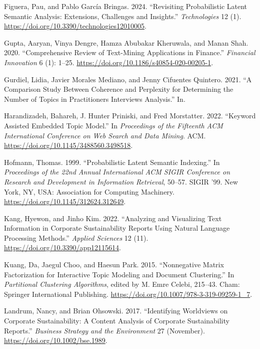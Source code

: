 \documentclass[
]{article}
\newlength{\cslhangindent}
\newlength{\cslentryspacingunit} %
\newenvironment{CSLReferences}[2] %
 {%
  \setlength{\parindent}{0pt}
  \ifodd #1
  \let\oldpar\par
  \def\par{\hangindent=\cslhangindent\oldpar}
  \fi
  \setlength{\parskip}{#2\cslentryspacingunit}
 }%
 {}
\begin{document}
\begin{CSLReferences}{1}{0}
\leavevmode{}%
Figuera, Pau, and Pablo García Bringas. 2024. {``Revisiting Probabilistic Latent Semantic Analysis: Extensions, Challenges and Insights.''} \emph{Technologies} 12 (1). \url{https://doi.org/10.3390/technologies12010005}.

\leavevmode{}%
Gupta, Aaryan, Vinya Dengre, Hamza Abubakar Kheruwala, and Manan Shah. 2020. {``Comprehensive Review of Text-Mining Applications in Finance.''} \emph{Financial Innovation} 6 (1): 1--25. \url{https://doi.org/10.1186/s40854-020-00205-1}.

\leavevmode{}%
Gurdiel, Lidia, Javier Morales Mediano, and Jenny Cifuentes Quintero. 2021. {``A Comparison Study Between Coherence and Perplexity for Determining the Number of Topics in Practitioners Interviews Analysis.''} In.

\leavevmode{}%
Harandizadeh, Bahareh, J. Hunter Priniski, and Fred Morstatter. 2022. {``Keyword Assisted Embedded Topic Model.''} In \emph{Proceedings of the Fifteenth {ACM} International Conference on Web Search and Data Mining}. {ACM}. \url{https://doi.org/10.1145/3488560.3498518}.

\leavevmode{}%
Hofmann, Thomas. 1999. {``Probabilistic Latent Semantic Indexing.''} In \emph{Proceedings of the 22nd Annual International ACM SIGIR Conference on Research and Development in Information Retrieval}, 50--57. SIGIR '99. New York, NY, USA: Association for Computing Machinery. \url{https://doi.org/10.1145/312624.312649}.

\leavevmode{}%
Kang, Hyewon, and Jinho Kim. 2022. {``Analyzing and Visualizing Text Information in Corporate Sustainability Reports Using Natural Language Processing Methods.''} \emph{Applied Sciences} 12 (11). \url{https://doi.org/10.3390/app12115614}.

\leavevmode{}%
Kuang, Da, Jaegul Choo, and Haesun Park. 2015. {``Nonnegative Matrix Factorization for Interactive Topic Modeling and Document Clustering.''} In \emph{Partitional Clustering Algorithms}, edited by M. Emre Celebi, 215--43. Cham: Springer International Publishing. \url{https://doi.org/10.1007/978-3-319-09259-1_7}.

\leavevmode{}%
Landrum, Nancy, and Brian Ohsowski. 2017. {``Identifying Worldviews on Corporate Sustainability: A Content Analysis of Corporate Sustainability Reports.''} \emph{Business Strategy and the Environment} 27 (November). \url{https://doi.org/10.1002/bse.1989}.


\end{CSLReferences}
\end{document}

